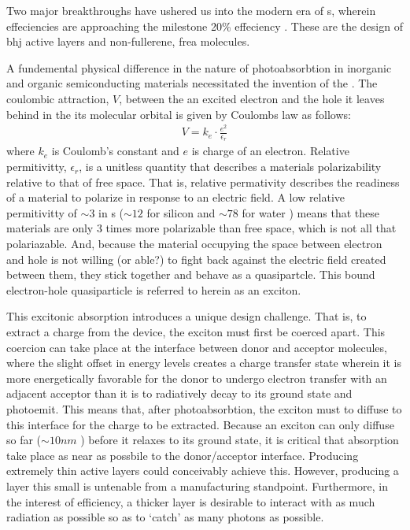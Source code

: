 Two major breakthroughs have ushered us into the modern era of s,
wherein effeciencies are approaching the milestone 20\% effeciency \cite{Liu2020b}.
These are the design of \gls{bhj} active layers and non-fullerene, \gls{frea} molecules. 

A fundemental physical difference in the nature of photoabsorbtion in inorganic and organic 
semiconducting materials necessitated the
invention of the . The coulombic attraction, $V$, between the an excited
electron and the hole it leaves behind in the its molecular orbital
is given by Coulombs law as follows:
\begin{align}
    \label{coulomb}
    V  = k_{e} \cdot \frac{e^{2}}{\epsilon_{r}}
\end{align}
where $k_{e}$ is Coulomb's constant and $e$ is charge of an electron. Relative permitivitty,
$\epsilon_{r}$, is a unitless quantity that describes a materials polarizability relative
to that of free space. That is, relative
permativity describes the readiness of a material
to polarize in response to an electric field. A low
relative permitivitty of ${\sim}3$ in s (${\sim}12$ for silicon \cite{Baroni1986} and ${\sim}78$ for water \cite{George2004})
means that these materials are only $3$ times more polarizable than free space, which
is not all that polariazable. And, because the material occupying the space between electron and hole
is not willing (or able?) to fight back against the electric field created between them, they stick together and behave as a quasipartcle. 
This bound electron-hole quasiparticle is referred to herein as an exciton.

This excitonic absorption introduces a unique design challenge.
That is, to extract a charge from the device, the exciton
must first be coerced apart. This coercion can take place at the interface between donor and acceptor molecules,
where the slight offset in energy levels creates a charge transfer state wherein it is more
energetically favorable for the donor to undergo electron transfer with an adjacent acceptor than
it is to radiatively decay to its ground state and photoemit.
This means that, after photoabsorbtion, the exciton must to diffuse to this interface for the charge to be
extracted. Because an exciton can only diffuse so far (${\sim}10nm$ \cite{clarke2010}) before it relaxes to
its ground state, it is critical that absorption take place as near as possbile to the donor/acceptor
interface. 
Producing extremely thin active layers could conceivably achieve this. However,
producing a layer this small is untenable from a manufacturing standpoint. Furthermore, in the interest of
efficiency, a thicker layer
is desirable to interact with as much radiation as possible so as to `catch' as many photons
as possible. 


